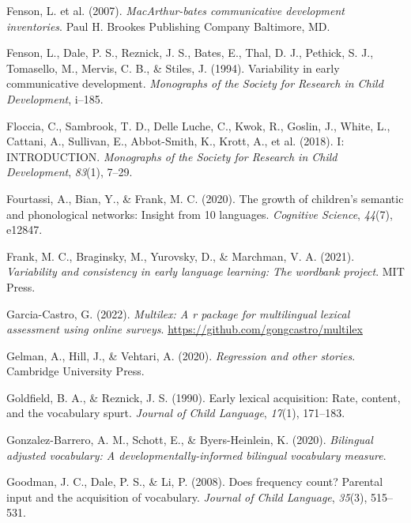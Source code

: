 \documentclass[
  letterpaper,
  DIV=11,
  numbers=noendperiod]{scrartcl}
\newlength{\cslhangindent}
\newlength{\cslentryspacingunit} %
\newenvironment{CSLReferences}[2] %
 {%
  \setlength{\parindent}{0pt}
  \ifodd #1
  \let\oldpar\par
  \def\par{\hangindent=\cslhangindent\oldpar}
  \fi
  \setlength{\parskip}{#2\cslentryspacingunit}
 }%
 {}
\begin{document}
\begin{CSLReferences}{1}{0}
\leavevmode{}%
Fenson, L. et al. (2007). \emph{MacArthur-bates communicative
development inventories}. Paul H. Brookes Publishing Company Baltimore,
MD.

\leavevmode{}%
Fenson, L., Dale, P. S., Reznick, J. S., Bates, E., Thal, D. J.,
Pethick, S. J., Tomasello, M., Mervis, C. B., \& Stiles, J. (1994).
Variability in early communicative development. \emph{Monographs of the
Society for Research in Child Development}, i--185.

\leavevmode{}%
Floccia, C., Sambrook, T. D., Delle Luche, C., Kwok, R., Goslin, J.,
White, L., Cattani, A., Sullivan, E., Abbot-Smith, K., Krott, A., et al.
(2018). I: INTRODUCTION. \emph{Monographs of the Society for Research in
Child Development}, \emph{83}(1), 7--29.

\leavevmode{}%
Fourtassi, A., Bian, Y., \& Frank, M. C. (2020). The growth of
children's semantic and phonological networks: Insight from 10
languages. \emph{Cognitive Science}, \emph{44}(7), e12847.

\leavevmode{}%
Frank, M. C., Braginsky, M., Yurovsky, D., \& Marchman, V. A. (2021).
\emph{Variability and consistency in early language learning: The
wordbank project}. MIT Press.

\leavevmode{}%
Garcia-Castro, G. (2022). \emph{Multilex: A r package for multilingual
lexical assessment using online surveys}.
\url{https://github.com/gongcastro/multilex}

\leavevmode{}%
Gelman, A., Hill, J., \& Vehtari, A. (2020). \emph{Regression and other
stories}. Cambridge University Press.

\leavevmode{}%
Goldfield, B. A., \& Reznick, J. S. (1990). Early lexical acquisition:
Rate, content, and the vocabulary spurt. \emph{Journal of Child
Language}, \emph{17}(1), 171--183.

\leavevmode{}%
Gonzalez-Barrero, A. M., Schott, E., \& Byers-Heinlein, K. (2020).
\emph{Bilingual adjusted vocabulary: A developmentally-informed
bilingual vocabulary measure}.

\leavevmode{}%
Goodman, J. C., Dale, P. S., \& Li, P. (2008). Does frequency count?
Parental input and the acquisition of vocabulary. \emph{Journal of Child
Language}, \emph{35}(3), 515--531.


\end{CSLReferences}
\end{document}
